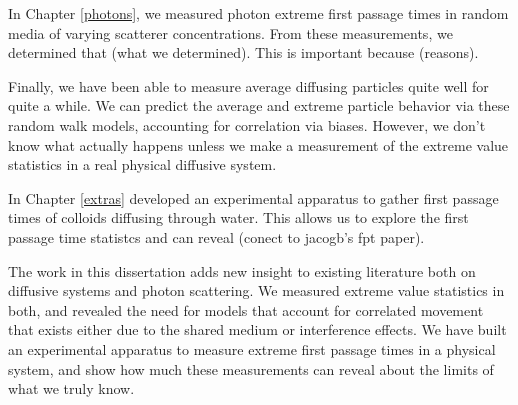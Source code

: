 In Chapter \ref{photons}, we measured photon extreme first passage times in random media of varying scatterer concentrations. From these measurements, we determined that (what we determined). This is important because (reasons). 

Finally, we have been able to measure average diffusing particles quite well for quite a while. We can predict the average and extreme particle behavior via these random walk models, accounting for correlation via biases. However, we don't know what actually happens unless we make a measurement of the extreme value statistics in a real physical diffusive system.

In Chapter \ref{extras} developed an experimental apparatus to gather first passage times of colloids diffusing through water. This allows us to explore the first passage time statistcs and can reveal (conect to jacogb's fpt paper). 

The work in this dissertation adds new insight to existing literature both on diffusive systems and photon scattering. We measured extreme value statistics in both, and revealed the need for models that account for correlated movement that exists either due to the shared medium or interference effects. We have built an experimental apparatus to measure extreme first passage times in a physical system, and show how much these measurements can reveal about the limits of what we truly know.
